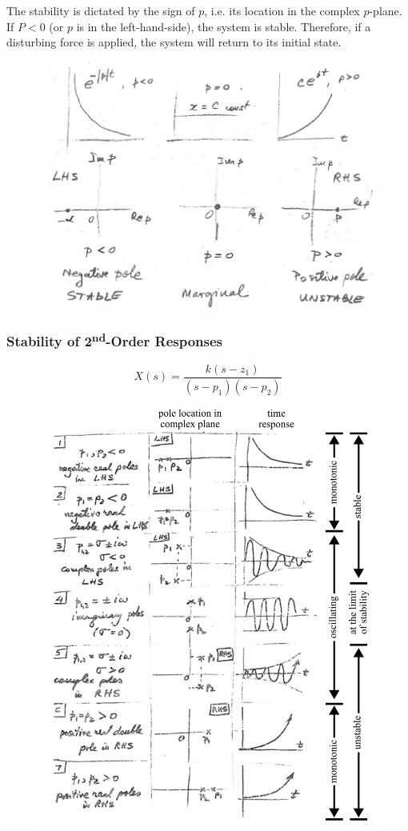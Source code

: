 \documentclass[12pt,letter]{article}
\numberwithin{ex}{section} %
\numberwithin{re}{section} %
\numberwithin{equation}{section}	%
\begin{document}
The stability is dictated by the sign of $p$, i.e. its location in the complex $p$-plane. If $P<0$ (or $p$ is in the left-hand-side), the system is stable. Therefore, if a disturbing force is applied, the system will return to its initial state.  


\begin{figure}[H]
	\centering
	\includegraphics[width=4.5in]{../figures/system_stability_first_order}
\end{figure}

\subsubsection{Stability of 2\textsuperscript{nd}-Order Responses}

\begin{equation}
X(s) = \frac{k(s-z_1)}{(s-p_1)(s-p_2)}
\end{equation}

\begin{figure}[H]
	\centering
	\includegraphics[width=4.5in]{../figures/2nd_order_poles}
\end{figure}
\end{document}
